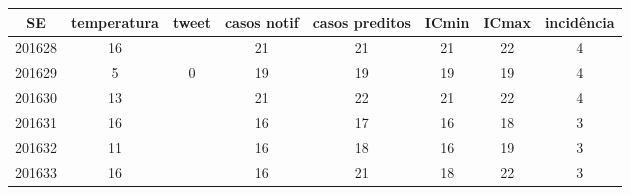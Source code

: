 \begin{tabular}{c|ccccccc}
  \hline
SE & temperatura & tweet & casos notif & casos preditos & ICmin & ICmax & incidência \\ 
  \hline
201628 & 16 &  & 21 & 21 & 21 & 22 & 4 \\ 
  201629 & 5 & 0 & 19 & 19 & 19 & 19 & 4 \\ 
  201630 & 13 &  & 21 & 22 & 21 & 22 & 4 \\ 
  201631 & 16 &  & 16 & 17 & 16 & 18 & 3 \\ 
  201632 & 11 &  & 16 & 18 & 16 & 19 & 3 \\ 
  201633 & 16 &  & 16 & 21 & 18 & 22 & 3 \\ 
   \hline
\end{tabular}

